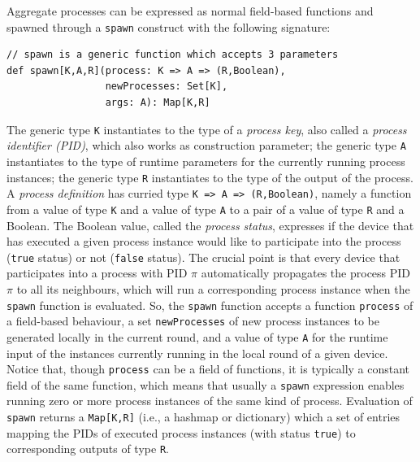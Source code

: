 Aggregate processes can be expressed as normal field-based functions and spawned through a \lstinline|spawn| construct
 with the following signature:
%
\begin{lstlisting}
// spawn is a generic function which accepts 3 parameters
def spawn[K,A,R](process: K => A => (R,Boolean),
                 newProcesses: Set[K],
                 args: A): Map[K,R]
\end{lstlisting}
%
The generic type \lstinline|K| instantiates to the type of a \emph{process key}, also called a \emph{process identifier (PID)}, which also works as construction parameter;
 the generic type \lstinline|A| instantiates to the type of runtime parameters for the currently running process instances;
 the generic type \lstinline|R| instantiates to the type of the output of the process.
%
A \emph{process definition} has curried type \lstinline|K => A => (R,Boolean)|, namely a function from a value of type \lstinline|K| and a value of type \lstinline|A| to a pair of a value of type \lstinline|R| and a Boolean.
%
The Boolean value, called the \emph{process status}, expresses if the device that has executed a given process instance
 would like to participate into the process (\lstinline|true| status)
 or not (\lstinline|false| status).
%
The crucial point is that every device that participates into a process with PID $\pi$ automatically propagates the process PID $\pi$ to all its neighbours, which will run a corresponding process instance when the \lstinline|spawn| function is evaluated.
%
So, the \lstinline|spawn| function accepts a function \lstinline|process| of a field-based behaviour,
 a set \lstinline|newProcesses| of new process instances to be generated locally in the current round,
 and a value of type \lstinline|A| for the runtime input of the instances currently running in the local round of a given device.
%
Notice that, though \lstinline|process| can be a field of functions, it is typically a constant field of the same function, which means that usually a \lstinline|spawn| expression enables running zero or more process instances of the same kind of process.
%
Evaluation of \lstinline|spawn| returns a \lstinline|Map[K,R]|
 (i.e., a hashmap or dictionary) which a set of entries
 mapping the PIDs of executed process instances (with status \lstinline|true|) to corresponding outputs of type \lstinline|R|.
%

